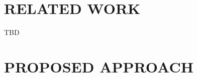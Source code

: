 \documentclass[9pt,academicons]{article}
\begin{document}






\section{RELATED WORK}
\label{sec:litsurvey}
TBD

\section{PROPOSED APPROACH}
\label{sec:proposal}
\end{document}
